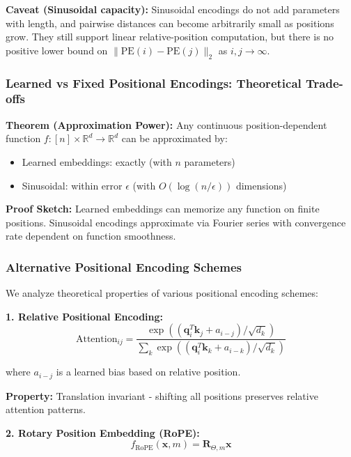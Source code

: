 \documentclass[11pt]{article}
\begin{document}
\textbf{Caveat (Sinusoidal capacity):} Sinusoidal encodings do not add parameters with length, and pairwise distances can become arbitrarily small as positions grow. They still support linear relative-position computation, but there is no positive lower bound on $\|\text{PE}(i)-\text{PE}(j)\|_2$ as $i,j \to \infty$.

\subsubsection{Learned vs Fixed Positional Encodings: Theoretical Trade-offs}

\textbf{Theorem (Approximation Power):} Any continuous position-dependent function $f: [n] \times \mathbb{R}^d \rightarrow \mathbb{R}^d$ can be approximated by:
\begin{itemize}
    \item Learned embeddings: exactly (with $n$ parameters)
    \item Sinusoidal: within error $\epsilon$ (with $O(\log(n/\epsilon))$ dimensions)
\end{itemize}

\textbf{Proof Sketch:} Learned embeddings can memorize any function on finite positions. Sinusoidal encodings approximate via Fourier series with convergence rate dependent on function smoothness.

\subsubsection{Alternative Positional Encoding Schemes}

We analyze theoretical properties of various positional encoding schemes:

\textbf{1. Relative Positional Encoding:}
\begin{equation}
\text{Attention}_{ij} = \frac{\exp((\mathbf{q}_i^T\mathbf{k}_j + a_{i-j})/\sqrt{d_k})}{\sum_k \exp((\mathbf{q}_i^T\mathbf{k}_k + a_{i-k})/\sqrt{d_k})}
\end{equation}

where $a_{i-j}$ is a learned bias based on relative position.

\textbf{Property:} Translation invariant - shifting all positions preserves relative attention patterns.

\textbf{2. Rotary Position Embedding (RoPE):}
\begin{equation}
f_{\text{RoPE}}(\mathbf{x}, m) = \mathbf{R}_{\Theta,m} \mathbf{x}
\end{equation}
\end{document}
